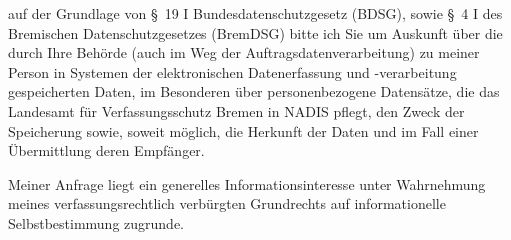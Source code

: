 auf der Grundlage von §~19 I Bundesdatenschutzgesetz (BDSG), sowie
§~4 I des Bremischen Datenschutzgesetzes (BremDSG) bitte ich Sie um Auskunft über
die durch Ihre Behörde (auch im Weg der Auftragsdatenverarbeitung) zu meiner Person
in Systemen der elektronischen Datenerfassung und -verarbeitung gespeicherten Daten,
im Besonderen über personenbezogene Datensätze, die das Landesamt für Verfassungsschutz
Bremen in NADIS pflegt, den Zweck der Speicherung sowie, soweit möglich, die Herkunft
der Daten und im Fall einer Übermittlung deren Empfänger.

Meiner Anfrage liegt ein generelles Informationsinteresse unter Wahrnehmung
meines verfassungsrechtlich verbürgten Grundrechts auf informationelle
Selbstbestimmung zugrunde.
